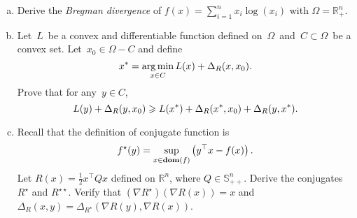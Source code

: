 \documentclass[a4paper]{article}
\begin{document}
\begin{enumerate}[a)]
    \item Derive the \textit{Bregman divergence} of $f(x)=\sum_{i=1}^n x_i\log(x_i)$ with $\Omega=\mathbb{R}^n_{+}$.
    
    \item Let~$L$~be a convex and differentiable function defined on~$\Omega$~and~$C \subset \Omega$~be a convex set. 
    Let~$x_0 \in \Omega - C$ and define
    \begin{equation}
        x^* = \mathop{\arg\min}\limits_{x \in C} L(x) + \Delta_{R} (x, x_0). \notag
    \end{equation}
    Prove that for any~$y \in C$,
    \begin{equation}
        L(y) + \Delta_{R}(y, x_0) \geqslant L(x^*) + \Delta_{R} (x^*, x_0) + \Delta_{R} (y, x^*). \notag
    \end{equation}
    
    \item Recall that the definition of conjugate function is
    \begin{equation}
        f^{\star}(y) = \sup_{x \in \textbf{dom}(f)} \left(y^{\top}x - f(x)\right). \notag
    \end{equation}
    Let $R(x)=\frac{1}{2}x^{\top}Qx$ defined on $\mathbb{R}^n$, where $Q\in\mathbb{S}^n_{++}$. Derive the conjugates $R^{\star}$ and $R^{\star\star}$. Verify that $(\nabla R^{\star})(\nabla R(x))=x$ and $\Delta_{R}(x,y) = \Delta_{R^{\star}} (\nabla R(y), \nabla R(x))$.
\end{enumerate}
\end{document}
